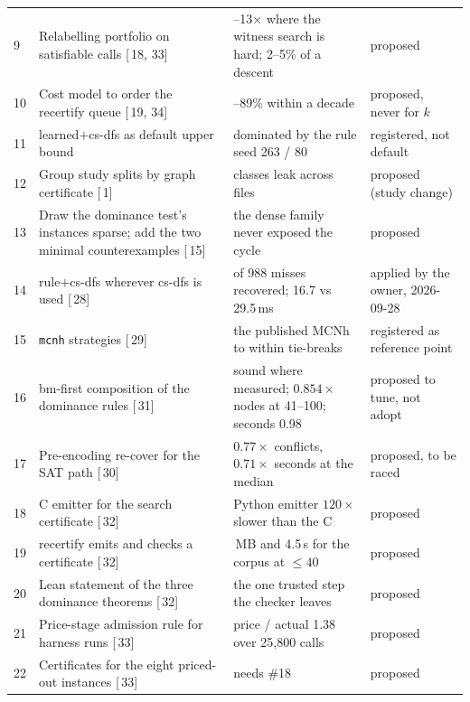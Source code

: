 \documentclass[11pt,a4paper]{article}
\renewcommand{\S}[1]{[\textsection\,#1]}
\newcommand{\code}[1]{\texttt{#1}}
\begin{document}
\begin{longtable}{l>{\raggedright\arraybackslash}p{}>{\raggedright\arraybackslash}p{}>{\raggedright\arraybackslash}p{}}
9 & Relabelling portfolio on satisfiable calls \S{18, 33} & 8--13$\times$ where the witness search is hard; 2--5\% of a descent & proposed \\
10 & Cost model to order the recertify queue \S{19, 34} & 88--89\% within a decade & proposed, never for $k$ \\
11 & learned$+$cs-dfs as default upper bound & dominated by the rule seed 263 / 80 & registered, not default \\
12 & Group study splits by graph certificate \S{1} & 157 classes leak across files & proposed (study change) \\
13 & Draw the dominance test's instances sparse; add the two minimal counterexamples \S{15} & the dense family never exposed the cycle & proposed \\
14 & rule$+$cs-dfs wherever cs-dfs is used \S{28} & 627 of 988 misses recovered; 16.7 vs 29.5\,ms & applied by the owner, 2026-09-28 \\
15 & \code{mcnh} strategies \S{29} & the published MCNh to within tie-breaks & registered as reference point \\
16 & bm-first composition of the dominance rules \S{31} & sound where measured; $0.854\times$ nodes at 41--100; seconds 0.98 & proposed to tune, not adopt \\
17 & Pre-encoding re-cover for the SAT path \S{30} & $0.77\times$ conflicts, $0.71\times$ seconds at the median & proposed, to be raced \\
18 & C emitter for the search certificate \S{32} & Python emitter $120\times$ slower than the C & proposed \\
19 & recertify emits and checks a certificate \S{32} & 5.0\,MB and 4.5\,s for the corpus at $\le 40$ & proposed \\
20 & Lean statement of the three dominance theorems \S{32} & the one trusted step the checker leaves & proposed \\
21 & Price-stage admission rule for harness runs \S{33} & price / actual 1.38 over 25,800 calls & proposed \\
22 & Certificates for the eight priced-out instances \S{33} & needs \#18 & proposed \\
\end{longtable}
\normalsize
\end{document}
